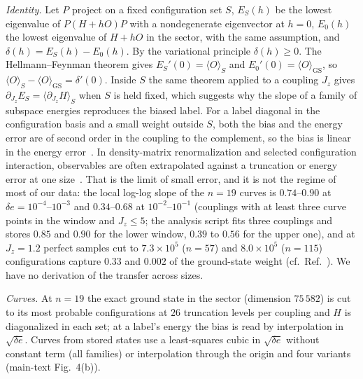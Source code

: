 \documentclass[aps,prx,onecolumn,10pt,nofootinbib,longbibliography,floatfix]{revtex4-2}
\theoremstyle{remark}
\newcommand{\Jz}{J_z}
\newcommand{\de}{\delta e}
\newcommand{\GS}{\mathrm{GS}}
\begin{document}
\emph{Identity.} Let $P$ project on a fixed configuration set $S$, $E_S(h)$ be the lowest eigenvalue of $P(H+hO)P$ with
a nondegenerate eigenvector at $h=0$, $E_0(h)$ the lowest eigenvalue of $H+hO$ in the sector, with the same assumption,
and $\delta(h)=E_S(h)-E_0(h)$. By the variational principle $\delta(h)\ge0$. The Hellmann--Feynman theorem gives
$E_S'(0)=\langle O\rangle_S$ and $E_0'(0)=\langle O\rangle_\GS$, so $\langle O\rangle_S-\langle O\rangle_\GS=\delta'(0)$.
Inside $S$ the same theorem applied to a coupling $\Jz$ gives $\partial_{\Jz}E_S=\langle\partial_{\Jz}H\rangle_S$ when
$S$ is held fixed, which suggests why the slope of a family of subspace energies reproduces the biased label.
For a label diagonal in the configuration basis and a small weight outside $S$, both the bias and the energy error
are of second order in the coupling to the complement, so the bias is linear in the energy error~\cite{white2007}.
In density-matrix renormalization and selected configuration interaction, observables are often extrapolated against
a truncation or energy error at one size~\cite{white2007,stoudenmire2012,damour2023}.
That is the limit of small error, and it is not the regime of most of our data: the local log-log slope of the $n=19$
curves is $0.74$--$0.90$ at $\de=10^{-4}$--$10^{-3}$ and $0.34$--$0.68$ at $10^{-2}$--$10^{-1}$ (couplings with at %
least three curve points in the window and $\Jz\le5$; the analysis script fits three couplings and stores $0.85$ and %
$0.90$ for the lower window, $0.39$ to $0.56$ for the upper one), and at $\Jz=1.2$ perfect samples cut to %
$7.3\times10^5$ ($n=57$) and $8.0\times10^5$ ($n=115$) configurations capture $0.33$ and $0.002$ of the ground-state %
weight (cf.\ Ref.~\cite{bonilla2026spectral}). We have no derivation of the transfer across sizes.

\emph{Curves.} At $n=19$ the exact ground state in the sector (dimension $75\,582$) is cut to its most probable %
configurations at $26$ truncation levels per coupling and $H$ is diagonalized in each set; at a label's energy the %
bias is read by interpolation in $\sqrt{\de}$. Curves from stored states use a least-squares cubic in $\sqrt{\de}$
without constant term (all families) or interpolation through the origin and four variants (main-text Fig.~4(b)). %
\end{document}
